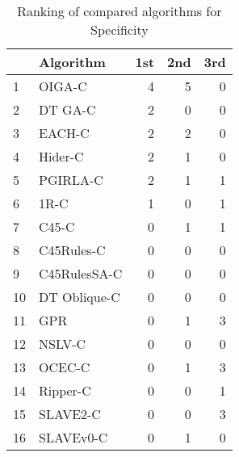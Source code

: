 \begin{table}
\footnotesize
\caption{Ranking of compared algorithms for Specificity}
\label{tab:places Specificity}
\begin{tabular}{llrrr}
\hline
 & Algorithm & 1st & 2nd & 3rd \\
\hline
1 & OIGA-C & 4 & 5 & 0 \\
2 & DT GA-C & 2 & 0 & 0 \\
3 & EACH-C & 2 & 2 & 0 \\
4 & Hider-C & 2 & 1 & 0 \\
5 & PGIRLA-C & 2 & 1 & 1 \\
6 & 1R-C & 1 & 0 & 1 \\
7 & C45-C & 0 & 1 & 1 \\
8 & C45Rules-C & 0 & 0 & 0 \\
9 & C45RulesSA-C & 0 & 0 & 0 \\
10 & DT Oblique-C & 0 & 0 & 0 \\
11 & GPR & 0 & 1 & 3 \\
12 & NSLV-C & 0 & 0 & 0 \\
13 & OCEC-C & 0 & 1 & 3 \\
14 & Ripper-C & 0 & 0 & 1 \\
15 & SLAVE2-C & 0 & 0 & 3 \\
16 & SLAVEv0-C & 0 & 1 & 0 \\
\hline
\end{tabular}
\end{table}
